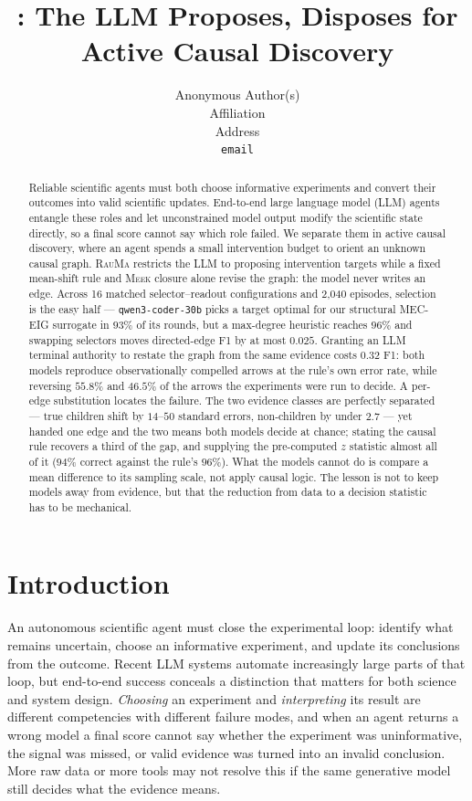\documentclass{article}
\title{\rauma: The LLM Proposes, \meek{} Disposes for\\ Active Causal Discovery}
\author{%
  Anonymous Author(s) \\
  Affiliation \\
  Address \\
  \texttt{email} \\
}
\newcommand{\rauma}{\textsc{RauMa}}
\newcommand{\meek}{\textsc{Meek}}
\begin{document}
\maketitle

\begin{abstract}
Reliable scientific agents must both choose informative experiments and convert their outcomes
into valid scientific updates. End-to-end large language model (LLM) agents entangle these roles
and let unconstrained model output modify the scientific state directly, so a final score cannot
say which role failed. We separate them in active causal discovery, where an agent spends a small
intervention budget to orient an unknown causal graph. \rauma{} restricts the LLM to proposing
intervention targets while a fixed mean-shift rule and \meek{} closure alone revise the graph:
the model never writes an edge. Across 16 matched selector--readout configurations and 2{,}040
episodes, selection is the easy half --- \texttt{qwen3-coder-30b} picks a target optimal for our
structural MEC-EIG surrogate in $93\%$ of its rounds, but a max-degree heuristic reaches $96\%$
and swapping selectors moves directed-edge F1 by at most $0.025$. Granting an LLM terminal
authority to restate the graph from the same evidence costs $0.32$ F1: both models reproduce
observationally compelled arrows at the rule's own error rate, while reversing $55.8\%$ and
$46.5\%$ of the arrows the experiments were run to decide. A per-edge substitution locates the
failure. The two evidence classes are perfectly separated --- true children shift by $14$--$50$
standard errors, non-children by under $2.7$ --- yet handed one edge and the two means both
models decide at chance; stating the causal rule recovers a third of the gap, and supplying the
pre-computed $z$ statistic almost all of it ($94\%$ correct against the rule's $96\%$). What the
models cannot do is compare a mean difference to its sampling scale, not apply causal logic. The
lesson is not to keep models away from evidence, but that the reduction from data to a decision
statistic has to be mechanical.
\end{abstract}

\section{Introduction}
\label{sec:intro}

An autonomous scientific agent must close the experimental loop: identify what remains
uncertain, choose an informative experiment, and update its conclusions from the outcome. Recent
LLM systems automate increasingly large parts of that loop, but end-to-end success conceals a
distinction that matters for both science and system design. \emph{Choosing} an experiment and
\emph{interpreting} its result are different competencies with different failure modes, and when
an agent returns a wrong model a final score cannot say whether the experiment was
uninformative, the signal was missed, or valid evidence was turned into an invalid conclusion.
More raw data or more tools may not resolve this if the same generative model still decides what
the evidence means.
\end{document}
